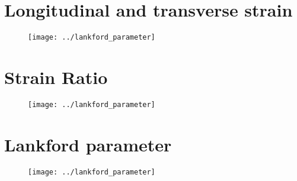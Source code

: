 \documentclass[12pt]{article}
\begin{document}
\section{Longitudinal and transverse strain}


\begin{figure}[H]
  \centering
    \texttt{[image: ../lankford\_parameter]}
\end{figure}

\section{Strain Ratio}

\begin{figure}[H]
  \centering
    \texttt{[image: ../lankford\_parameter]}
\end{figure}


\section{Lankford parameter}

\begin{figure}[H]
  \centering
    \texttt{[image: ../lankford\_parameter]}
\end{figure}
\end{document}

